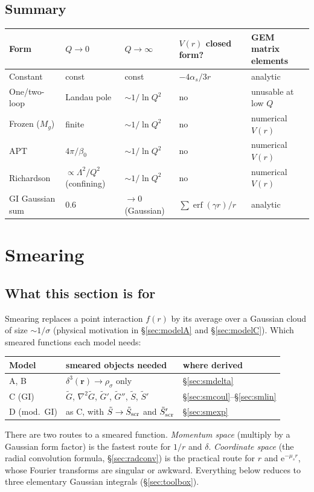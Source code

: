 \documentclass[11pt,a4paper]{article}
\numberwithin{equation}{section}
\theoremstyle{definition}
\theoremstyle{plain}
\theoremstyle{remark}
\numberwithin{algorithm}{section}
\newcommand{\vr}{\bm r}
\newcommand{\as}{\alpha_s}
\newcommand{\ee}{\mathrm{e}}
\newcommand{\erf}{\operatorname{erf}}
\newcommand{\mus}{\mu_s}
\begin{document}
\subsection{Summary}
\begin{center}\small
\begin{tabular}{@{}lllll@{}}
\toprule
Form & $Q\to0$ & $Q\to\infty$ & $V(r)$ closed form? & GEM matrix elements\\\midrule
Constant & const & const & $-4\as/3r$ & analytic\\
One/two-loop & Landau pole & $\sim1/\ln Q^2$ & no & unusable at low $Q$\\
Frozen ($M_g$) & finite & $\sim1/\ln Q^2$ & no & numerical $V(r)$\\
APT & $4\pi/\beta_0$ & $\sim1/\ln Q^2$ & no & numerical $V(r)$\\
Richardson & $\propto\Lambda^2/Q^2$ (confining) & $\sim1/\ln Q^2$ & no & numerical $V(r)$\\
GI Gaussian sum & $0.6$ & $\to0$ (Gaussian) & $\sum\erf(\gamma r)/r$ & analytic\\\bottomrule
\end{tabular}
\end{center}
\section{Smearing}\label{sec:smear}

\subsection{What this section is for}
Smearing replaces a point interaction $f(r)$ by its average over a Gaussian cloud of size $\sim1/\sigma$ (physical motivation in \S\ref{sec:modelA} and \S\ref{sec:modelC}). Which smeared functions each model needs:
\begin{center}\small
\begin{tabular}{@{}lll@{}}\toprule
Model & smeared objects needed & where derived\\\midrule
A, B & $\delta^3(\vr)\to\rho_\sigma$ only & \S\ref{sec:smdelta}\\
C (GI) & $\tilde G$, $\nabla^2\tilde G$, $\tilde G'$, $\tilde G''$, $\tilde S$, $\tilde S'$ & \S\ref{sec:smcoul}--\S\ref{sec:smlin}\\
D (mod.\ GI) & as C, with $\tilde S\to\tilde S_{\rm scr}$ and $\tilde S'_{\rm scr}$ & \S\ref{sec:smexp}\\\bottomrule
\end{tabular}
\end{center}
There are two routes to a smeared function. \emph{Momentum space} (multiply by a Gaussian form factor) is the fastest route for $1/r$ and $\delta$. \emph{Coordinate space} (the radial convolution formula, \S\ref{sec:radconv}) is the practical route for $r$ and $\ee^{-\mus r}$, whose Fourier transforms are singular or awkward. Everything below reduces to three elementary Gaussian integrals (\S\ref{sec:toolbox}).
\end{document}
